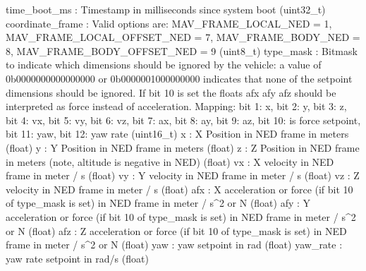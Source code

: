 \begin{DoxyVerb}
\begin{DoxyVerb}
\begin{DoxyVerb}
\begin{DoxyVerb}
\begin{DoxyVerb}
time_boot_ms              : Timestamp in milliseconds since system boot (uint32_t)
coordinate_frame          : Valid options are: MAV_FRAME_LOCAL_NED = 1, MAV_FRAME_LOCAL_OFFSET_NED = 7, MAV_FRAME_BODY_NED = 8, MAV_FRAME_BODY_OFFSET_NED = 9 (uint8_t)
type_mask                 : Bitmask to indicate which dimensions should be ignored by the vehicle: a value of 0b0000000000000000 or 0b0000001000000000 indicates that none of the setpoint dimensions should be ignored. If bit 10 is set the floats afx afy afz should be interpreted as force instead of acceleration. Mapping: bit 1: x, bit 2: y, bit 3: z, bit 4: vx, bit 5: vy, bit 6: vz, bit 7: ax, bit 8: ay, bit 9: az, bit 10: is force setpoint, bit 11: yaw, bit 12: yaw rate (uint16_t)
x                         : X Position in NED frame in meters (float)
y                         : Y Position in NED frame in meters (float)
z                         : Z Position in NED frame in meters (note, altitude is negative in NED) (float)
vx                        : X velocity in NED frame in meter / s (float)
vy                        : Y velocity in NED frame in meter / s (float)
vz                        : Z velocity in NED frame in meter / s (float)
afx                       : X acceleration or force (if bit 10 of type_mask is set) in NED frame in meter / s^2 or N (float)
afy                       : Y acceleration or force (if bit 10 of type_mask is set) in NED frame in meter / s^2 or N (float)
afz                       : Z acceleration or force (if bit 10 of type_mask is set) in NED frame in meter / s^2 or N (float)
yaw                       : yaw setpoint in rad (float)
yaw_rate                  : yaw rate setpoint in rad/s (float)\end{DoxyVerb}
 \mbox{\label{classpymavlink_1_1dialects_1_1v10_1_1MAVLink_a2c5869b321c71629faa5be6224bad932}} 

\end{DoxyVerb}
\end{DoxyVerb}
\end{DoxyVerb}
\end{DoxyVerb}
